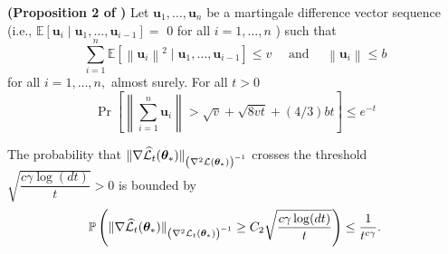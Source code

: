 


% 
\begin{lemma}\textbf{(Proposition 2 of \citep{hsu2012tail})}
\label{lemma:vector-martingale}
Let $\mathbf{u}_{1}, \ldots, \mathbf{u}_{n}$ be a martingale difference vector sequence (i.e., $\mathbb{E}\left[\mathbf{u}_{i} \mid \mathbf{u}_{1}, \ldots, \mathbf{u}_{i-1}\right]=$ 0 for all $i=1, \ldots, n$ ) such that
$$
\sum_{i=1}^{n} \mathbb{E}\left[\left\|\mathbf{u}_{i}\right\|^{2} \mid \mathbf{u}_{1}, \ldots, \mathbf{u}_{i-1}\right] \leq v \quad \text { and } \quad\left\|\mathbf{u}_{i}\right\| \leq b
$$
for all $i=1, \ldots, n,$ almost surely. For all $t>0$
$$
\operatorname{Pr}\left[\left\|\sum_{i=1}^{n} \mathbf{u}_{i}\right\|>\sqrt{v}+\sqrt{8 v t}+(4 / 3) b t\right] \leq e^{-t}
$$
\end{lemma}

\begin{lemma}
\label{lemma:vector-conc}
  The probability that $\|\nabla \widehat{\cal L}_t(\bm{\theta}_*)\|_{\left(\nabla^{2} {\cal L}\left(\bm{\theta}_{*}\right)\right)^{-1}} $ crosses the threshold $\sqrt{\dfrac{c\gamma\log (dt)}{t}} > 0$ is bounded by
 \begin{align*}
     \mathbb{P}\left(\|\nabla \widehat{\cal L}_t(\bm{\theta}_*)\|_{\left(\nabla^{2} {\cal L}_{t}\left(\bm{\theta}_{*}\right)\right)^{-1}}\geq C_2\sqrt{\dfrac{c\gamma\log (dt)}{t}}\right) \leq \frac{1}{t^{c\gamma}}.
 \end{align*}
\end{lemma}

